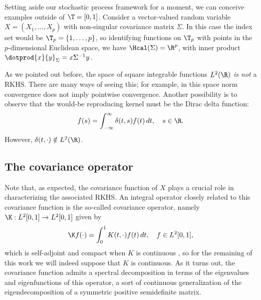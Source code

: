 
\begin{example}
  Setting aside our stochastic process framework for a moment, we can conceive examples outside of \(\T =[0,1]\). Consider a vector-valued random variable \(X = (X_1, \dots, X_p)\) with non-singular covariance matrix \(\Sigma\). In this case the index set would be \(\T_p = \{1,\dots,p\}\), so identifying functions on \(\T_p\) with points in the \(p\)-dimensional Euclidean space, we have \(\Hcal(\Sigma)=\R^p\), with inner product \(\dotprod{x}{y}_\Sigma=x\Sigma^{-1}y\).
\end{example}

\begin{example}
  As we pointed out before, the space of square integrable functions \(L^2(\R)\) \textit{is not} a RKHS. There are many ways of seeing this; for example, in this space norm convergence does not imply pointwise convergence. Another possibility is to observe that the would-be reproducing kernel must be the Dirac delta function:
  \[
    f(s) = \int_{-\infty}^\infty \delta(t, s) f(t)\, dt, \quad s \in \R.
  \]
  However, \(\delta(t, \cdot) \notin L^2(\R)\).
\end{example}

\subsection*{The covariance operator}

 Note that, as expected, the covariance function of \(X\) plays a crucial role in characterizing the associated RKHS. An integral operator closely related to this covariance function is the so-called covariance operator, namely \(\K: L^2[0,1] \to L^2[0,1]\) given by
\[
\K f(\cdot) = \int_0^1 K(t, \cdot)f(t)\, dt, \quad f \in L^2[0, 1],
\]
which is self-adjoint and compact when \(K\) is continuous \citep[e.g.][Th.~4.6.2]{hsing2015theoretical}, so for the remaining of this work we will indeed suppose that \(K\) is continuous. As it turns out, the covariance function admits a spectral decomposition in terms of the eigenvalues and eigenfunctions of this operator, a sort of continuous generalization of the eigendecomposition of a symmetric positive semidefinite matrix.

